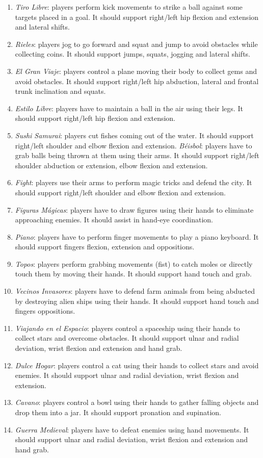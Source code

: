 \begin{enumerate}
    \item \emph{Tiro Libre}: players perform kick movements to strike a ball against some targets placed in a goal. It should support right/left hip flexion and extension and lateral shifts.
    \item \emph{Rieles}: players jog to go forward and squat and jump to avoid obstacles while collecting coins. It should support jumps, squats, jogging and lateral shifts.
    \item \emph{El Gran Viaje}: players control a plane moving their body to collect gems and avoid obstacles. It should support right/left hip abduction, lateral and frontal trunk inclination and squats.
    \item \emph{Estilo Libre}: players have to maintain a ball in the air using their legs. It should support right/left hip flexion and extension.
    \item \emph{Sushi Samurai}: players cut fishes coming out of the water. It should support right/left shoulder and elbow flexion and extension.
    \emph{B\'eisbol}: players have to grab balls being thrown at them using their arms. It should support right/left shoulder abduction or extension, elbow flexion and extension.
    \item \emph{Fight}: players use their arms to perform magic tricks and defend the city. It should support right/left shoulder and elbow flexion and extension.
    \item \emph{Figuras M\'agicas}: players have to draw figures using their hands to eliminate approaching enemies. It should assist in hand-eye coordination.
    \item \emph{Piano}: players have to perform finger movements to play a piano keyboard. It should support fingers flexion, extension and oppositions.
    \item \emph{Topos}: players perform grabbing movements (fist) to catch moles or directly touch them by moving their hands. It should support hand touch and grab.
    \item \emph{Vecinos Invasores}: players have to defend farm animals from being abducted by destroying alien ships using their hands. It should support hand touch and fingers oppositions.
    \item \emph{Viajando en el Espacio}: players control a spaceship using their hands to collect stars and overcome obstacles. It should support ulnar and radial deviation, wrist flexion and extension and hand grab.
    \item \emph{Dulce Hogar}: players control a cat using their hands to collect stars and avoid enemies. It should support ulnar and radial deviation, wrist flexion and extension.
    \item \emph{Cavano}: players control a bowl using their hands to gather falling objects and drop them into a jar. It should support pronation and supination.
    \item \emph{Guerra Medieval}: players have to defeat enemies using hand movements. It should support ulnar and radial deviation, wrist flexion and extension and hand grab.
\end{enumerate}

